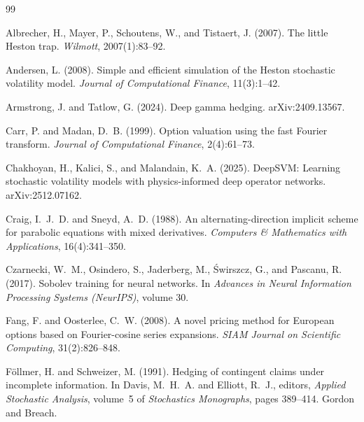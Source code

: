 \documentclass{article}
\begin{document}
\begin{thebibliography}{99}

Albrecher, H., Mayer, P., Schoutens, W., and Tistaert, J. (2007).
\newblock The little Heston trap.
\newblock \emph{Wilmott}, 2007(1):83--92.

Andersen, L. (2008).
\newblock Simple and efficient simulation of the Heston stochastic volatility model.
\newblock \emph{Journal of Computational Finance}, 11(3):1--42.

Armstrong, J. and Tatlow, G. (2024).
\newblock Deep gamma hedging.
\newblock arXiv:2409.13567.

Carr, P. and Madan, D.~B. (1999).
\newblock Option valuation using the fast Fourier transform.
\newblock \emph{Journal of Computational Finance}, 2(4):61--73.

Chakhoyan, H., Kalici, S., and Malandain, K.~A. (2025).
\newblock DeepSVM: Learning stochastic volatility models with physics-informed
deep operator networks.
\newblock arXiv:2512.07162.

Craig, I.~J.~D. and Sneyd, A.~D. (1988).
\newblock An alternating-direction implicit scheme for parabolic equations with
mixed derivatives.
\newblock \emph{Computers \& Mathematics with Applications}, 16(4):341--350.

Czarnecki, W.~M., Osindero, S., Jaderberg, M., \'Swirszcz, G., and Pascanu, R. (2017).
\newblock Sobolev training for neural networks.
\newblock In \emph{Advances in Neural Information Processing Systems (NeurIPS)}, volume 30.

Fang, F. and Oosterlee, C.~W. (2008).
\newblock A novel pricing method for European options based on Fourier-cosine
series expansions.
\newblock \emph{SIAM Journal on Scientific Computing}, 31(2):826--848.

F\"ollmer, H. and Schweizer, M. (1991).
\newblock Hedging of contingent claims under incomplete information.
\newblock In Davis, M.~H.~A. and Elliott, R.~J., editors, \emph{Applied Stochastic
Analysis}, volume~5 of \emph{Stochastics Monographs}, pages 389--414. Gordon and
Breach.


\end{thebibliography}
\end{document}
